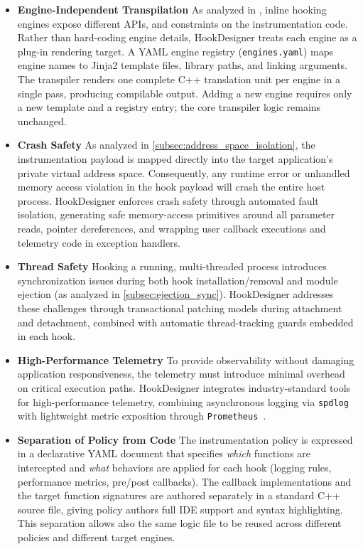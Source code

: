 \begin{itemize}
	\item \textbf{Engine-Independent Transpilation}
	As analyzed in , inline hooking engines expose different \acp{API}, and constraints on the instrumentation code.
	Rather than hard-coding engine details, HookDesigner treats each engine as a plug-in rendering target.
	A YAML engine registry (\texttt{engines.yaml}) maps engine names to Jinja2 template files, library paths, and linking arguments.
	The transpiler renders one complete C++ translation unit per engine in a single pass, producing compilable output.
	Adding a new engine requires only a new template and a registry entry; the core transpiler logic remains unchanged.
	
	\item \textbf{Crash Safety}
	As analyzed in \cref{subsec:address_space_isolation}, the instrumentation payload is mapped directly into the target application's private virtual address space.
	Consequently, any runtime error or unhandled memory access violation in the hook payload will crash the entire host process.
	HookDesigner enforces crash safety through automated fault isolation, generating safe memory-access primitives around all parameter reads, pointer dereferences, and wrapping user callback executions and telemetry code in exception handlers.
	
	\item \textbf{Thread Safety}
	Hooking a running, multi-threaded process introduces synchronization issues during both hook installation/removal and module ejection (as analyzed in \cref{subsec:ejection_sync}).
	HookDesigner addresses these challenges through transactional patching models during attachment and detachment, combined with automatic thread-tracking guards embedded in each hook.
	
	\item \textbf{High-Performance Telemetry}
	To provide observability without damaging application responsiveness, the telemetry must introduce minimal overhead on critical execution paths.
	HookDesigner integrates industry-standard tools for high-performance telemetry, combining asynchronous logging via \texttt{spdlog}~\cite{repo:spdlog} with lightweight metric exposition through \texttt{Prometheus}~\cite{website:prometheus,repo:prometheus-cpp}.
	
	\item \textbf{Separation of Policy from Code}
	The instrumentation policy is expressed in a declarative YAML document that specifies \emph{which} functions are intercepted and \emph{what} behaviors are applied for each hook (logging rules, performance metrics, pre/post callbacks).
	The callback implementations and the target function signatures are authored separately in a standard C++ source file, giving policy authors full IDE support and syntax highlighting.
	This separation allows also the same logic file to be reused across different policies and different target engines.
\end{itemize}


